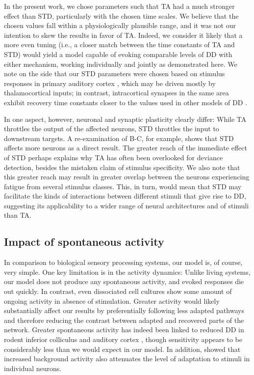 \documentclass[9pt,lineno,onehalfspacing]{elife}
\begin{document}
In the present work, we chose parameters such that TA had a much stronger effect than STD, particularly with the chosen time scales. We believe that the chosen values fall within a physiologically plausible range, and it was not our intention to skew the results in favor of TA. Indeed, we consider it likely that a more even tuning (i.e., a closer match between the time constants of TA and STD) would yield a model capable of evoking comparable levels of DD with either mechanism, working individually and jointly as demonstrated here. We note on the side that our STD parameters were chosen based on stimulus responses in primary auditory cortex \citep{David2013-cw,Pennington2020-ua}, which may be driven mostly by thalamocortical inputs; in contrast, intracortical synapses in the same area exhibit recovery time constants closer to the values used in other models of DD \citep{Asari2009-vu,Levy2011-af}.

In one aspect, however, neuronal and synaptic plasticity clearly differ: While TA throttles the output of the affected neurons, STD throttles the input to downstream targets. A re-examination of B-C, for example, shows that STD affects more neurons as a direct result. The greater reach of the immediate effect of STD perhaps explains why TA has often been overlooked for deviance detection, besides the mistaken claim of stimulus specificity. We also note that this greater reach may result in greater overlap between the neurons experiencing fatigue from several stimulus classes. This, in turn, would mean that STD may facilitate the kinds of interactions between different stimuli that give rise to DD, suggesting its applicability to a wider range of neural architectures and of stimuli than TA.

\subsection{Impact of spontaneous activity}

In comparison to biological sensory processing systems, our model is, of course, very simple. One key limitation is in the activity dynamics: Unlike living systems, our model does not produce any spontaneous activity, and evoked responses die out quickly. In contrast, even dissociated cell cultures show some amount of ongoing activity in absence of stimulation. Greater activity would likely substantially affect our results by preferentially following less adapted pathways and therefore reducing the contrast between adapted and recovered parts of the network. Greater spontaneous activity has indeed been linked to reduced DD in rodent inferior colliculus \citep{Duque2012-vx, Duque2015-eu} and auditory cortex \citep{Klein2014-op}, though sensitivity appears to be considerably less than we would expect in our model. In addition, \cite{Abolafia2011-ig} showed that increased background activity also attenuates the level of adaptation to stimuli in individual neurons.
\end{document}
